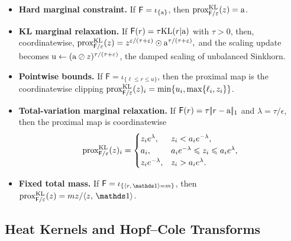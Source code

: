\begin{itemize}
\item \textbf{Hard marginal constraint.} If $\mathsf F=\iota_{\{\mathrm{a}\}}$, then $\operatorname{prox}_{\mathsf F/\varepsilon}^{\mathrm{KL}}(z)=\mathrm{a}$.
\item \textbf{KL marginal relaxation.} If $\mathsf F(r)=\tau\mathrm{KL}(r|\mathrm{a})$ with $\tau>0$, then, coordinatewise,
\(\operatorname{prox}_{\mathsf F/\varepsilon}^{\mathrm{KL}}(z) = z^{\varepsilon/(\tau+\varepsilon)}\odot \mathrm{a}^{\tau/(\tau+\varepsilon)},\)
and the scaling update becomes $\mathrm{u}\leftarrow(\mathrm{a}\oslash z)^{\tau/(\tau+\varepsilon)}$, the damped scaling of unbalanced Sinkhorn.
\item \textbf{Pointwise bounds.} If $\mathsf F=\iota_{\{\ell\leq r\leq u\}}$, then the proximal map is the coordinatewise clipping $\operatorname{prox}_{\mathsf F/\varepsilon}^{\mathrm{KL}}(z)_i=\min\{u_i,\max\{\ell_i,z_i\}\}$.
\item \textbf{Total-variation marginal relaxation.} If $\mathsf F(r)=\tau|\!| r-\mathrm{a} |\!|_1$ and $\lambda=\tau/\epsilon$, then the proximal map is coordinatewise
\[
\operatorname{prox}_{\mathsf F/\varepsilon}^{\mathrm{KL}}(z)_i
=
\begin{cases}
z_i e^{\lambda}, & z_i<a_i e^{-\lambda},\\
a_i, & a_i e^{-\lambda}\leqslant z_i\leqslant a_i e^{\lambda},\\
z_i e^{-\lambda}, & z_i>a_i e^{\lambda}.
\end{cases}
\]
\item \textbf{Fixed total mass.} If $\mathsf F=\iota_{\{\dotp{r}{\ones}=m\}}$, then $\prox_{\mathsf F/\epsilon}^{\KLD}(z)=m z/\dotp{z}{\ones}$.
\end{itemize}
\subsection{Heat Kernels and Hopf--Cole Transforms}
\label{sec-sinkhorn-heat-hopf-cole}

